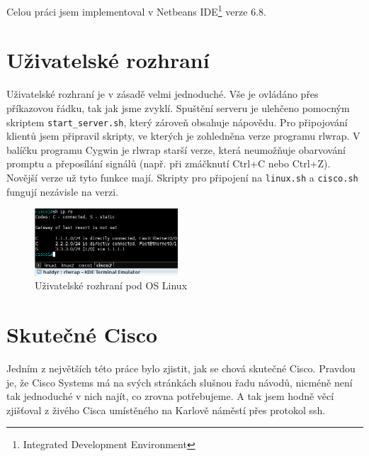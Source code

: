 Celou práci jsem implementoval v Netbeans IDE\footnote{Integrated Development Environment} verze 6.8.


\section{Uživatelské rozhraní}
Uživatelské rozhraní je v zásadě velmi jednoduché. Vše je ovládáno přes příkazovou řádku, tak jak jsme zvyklí. Spuštění serveru je ulehčeno pomocným skriptem \verb|start_server.sh|, který zároveň obsahuje nápovědu. Pro připojování klientů jsem připravil skripty, ve kterých je zohledněna verze programu rlwrap. V balíčku programu Cygwin je rlwrap starší verze, která neumožňuje obarvování promptu a přeposílání signálů (např. při zmáčknutí Ctrl+C nebo Ctrl+Z). Novější verze už tyto funkce mají. Skripty pro připojení na \verb|linux.sh| a \verb|cisco.sh| fungují nezávisle na verzi.

\begin{figure}[h]
\begin{center}
\includegraphics[height=2.5cm]{figures/uziv_rozhrani}
\caption{Uživatelské rozhraní pod OS Linux}
\label{fig:uziv_rozh}
\end{center}
\end{figure}


\section{Skutečné Cisco}
Jedním z největších  této práce bylo zjistit, jak se chová skutečné Cisco. Pravdou je, že Cisco Systems má na svých stránkách slušnou řadu návodů, nicméně není tak jednoduché v nich najít, co zrovna potřebujeme. A tak jsem hodně věcí zjišťoval z živého Cisca umístěného na Karlově náměstí přes protokol ssh. 








